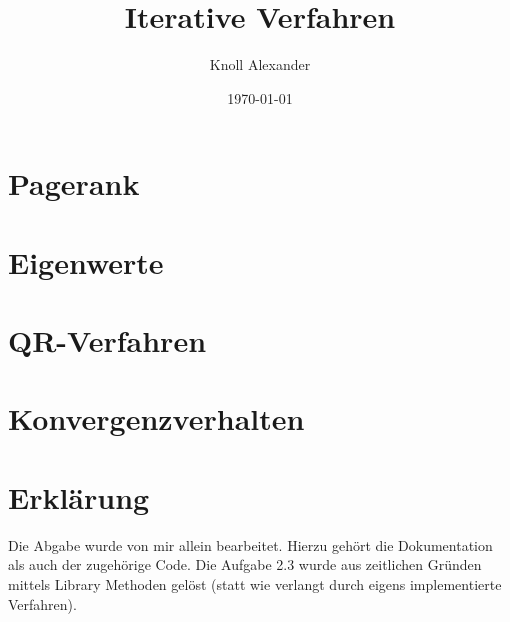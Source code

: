 \documentclass[12pt,titlepage]{article}
\author{Knoll Alexander }
\title{Iterative Verfahren}
\date{\today}
\begin{document}
\maketitle

\section{Pagerank}

\section{Eigenwerte}

\section{QR-Verfahren}

\section{Konvergenzverhalten}


\section{Erklärung}
	Die Abgabe wurde von mir allein bearbeitet. Hierzu gehört die Dokumentation als auch der zugehörige Code.
	Die Aufgabe 2.3 wurde aus zeitlichen Gründen mittels Library Methoden gelöst (statt wie verlangt durch eigens implementierte Verfahren).
			
			
%
%



\end{document}
